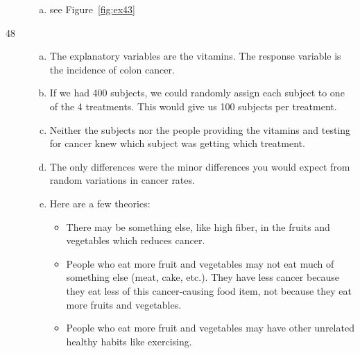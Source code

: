 \documentclass[letterpaper, landscape]{exam}
\begin{document}
\begin{description}
\begin{enumerate}[(a)]
          \item see Figure~\ref{fig:ex43}
        \end{enumerate}

      \item[48] 
        \begin{enumerate}[(a)]
          \item The explanatory variables are the vitamins.  The response
            variable is the incidence of colon cancer.

          \item If we had 400 subjects, we could randomly assign each subject to
            one of the 4 treatments.  This would give us 100 subjects per
            treatment.

          \item Neither the subjects nor the people providing the vitamins and
            testing for cancer knew which subject was getting which treatment.

          \item The only differences were the minor differences you would expect
            from random variations in cancer rates.

          \item Here are a few theories:
            \begin{itemize}
              \item There may be something else, like high fiber, in the fruits
                and vegetables which reduces cancer.  

              \item People who eat more fruit and vegetables may not eat much of
                something else (meat, cake, etc.).  They have less cancer
                because they eat less of this cancer-causing food item, not
                because they eat more fruits and vegetables.

              \item People who eat more fruit and vegetables may have other
                unrelated healthy habits like exercising.
            \end{itemize}
        \end{enumerate}
  \end{description}
\end{document}
